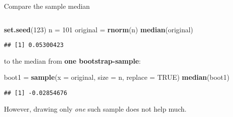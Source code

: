 \documentclass[10pt,ignorenonframetext,]{beamer}
\newenvironment{Shaded}{\begin{snugshade}}{\end{snugshade}}
\newcommand{\DataTypeTok}[1]{\textcolor[rgb]{0.13,0.29,0.53}{#1}}
\newcommand{\DecValTok}[1]{\textcolor[rgb]{0.00,0.00,0.81}{#1}}
\newcommand{\KeywordTok}[1]{\textcolor[rgb]{0.13,0.29,0.53}{\textbf{#1}}}
\newcommand{\NormalTok}[1]{#1}
\newcommand{\OtherTok}[1]{\textcolor[rgb]{0.56,0.35,0.01}{#1}}
\newcommand{\StringTok}[1]{\textcolor[rgb]{0.31,0.60,0.02}{#1}}
\begin{document}
\begin{frame}[fragile]

Compare the sample median

\(~\)

\scriptsize

\begin{Shaded}
\begin{Highlighting}[]
\KeywordTok{set.seed}\NormalTok{(}\DecValTok{123}\NormalTok{)}
\NormalTok{n =}\StringTok{ }\DecValTok{101}
\NormalTok{original =}\StringTok{ }\KeywordTok{rnorm}\NormalTok{(n)}
\KeywordTok{median}\NormalTok{(original)}
\end{Highlighting}
\end{Shaded}

\begin{verbatim}
## [1] 0.05300423
\end{verbatim}

\normalsize

to the median from \textbf{one bootstrap-sample}: \scriptsize

\begin{Shaded}
\begin{Highlighting}[]
\NormalTok{boot1 =}\StringTok{ }\KeywordTok{sample}\NormalTok{(}\DataTypeTok{x =}\NormalTok{ original, }\DataTypeTok{size =}\NormalTok{ n, }\DataTypeTok{replace =} \OtherTok{TRUE}\NormalTok{)}
\KeywordTok{median}\NormalTok{(boot1)}
\end{Highlighting}
\end{Shaded}

\begin{verbatim}
## [1] -0.02854676
\end{verbatim}

\normalsize

However, drawing only \emph{one} such sample does not help much.

\end{frame}
\end{document}
